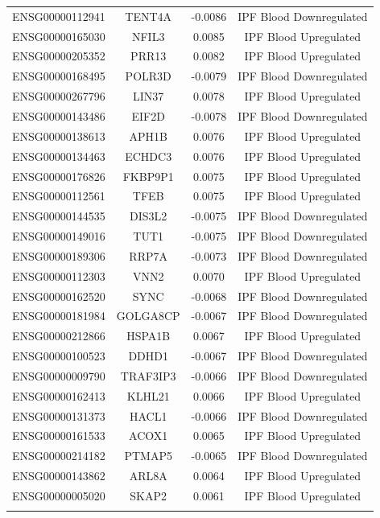 \documentclass[
]{article}
\begin{document}
\begin{singlespace}
\begin{longtable}[t]{lccc}
\addlinespace
ENSG00000112941 & TENT4A & -0.0086 & IPF Blood Downregulated\\
ENSG00000165030 & NFIL3 & 0.0085 & IPF Blood Upregulated\\
ENSG00000205352 & PRR13 & 0.0082 & IPF Blood Upregulated\\
ENSG00000168495 & POLR3D & -0.0079 & IPF Blood Downregulated\\
ENSG00000267796 & LIN37 & 0.0078 & IPF Blood Upregulated\\
\addlinespace
ENSG00000143486 & EIF2D & -0.0078 & IPF Blood Downregulated\\
ENSG00000138613 & APH1B & 0.0076 & IPF Blood Upregulated\\
ENSG00000134463 & ECHDC3 & 0.0076 & IPF Blood Upregulated\\
ENSG00000176826 & FKBP9P1 & 0.0075 & IPF Blood Upregulated\\
ENSG00000112561 & TFEB & 0.0075 & IPF Blood Upregulated\\
\addlinespace
ENSG00000144535 & DIS3L2 & -0.0075 & IPF Blood Downregulated\\
ENSG00000149016 & TUT1 & -0.0075 & IPF Blood Downregulated\\
ENSG00000189306 & RRP7A & -0.0073 & IPF Blood Downregulated\\
ENSG00000112303 & VNN2 & 0.0070 & IPF Blood Upregulated\\
ENSG00000162520 & SYNC & -0.0068 & IPF Blood Downregulated\\
\addlinespace
ENSG00000181984 & GOLGA8CP & -0.0067 & IPF Blood Downregulated\\
ENSG00000212866 & HSPA1B & 0.0067 & IPF Blood Upregulated\\
ENSG00000100523 & DDHD1 & -0.0067 & IPF Blood Downregulated\\
ENSG00000009790 & TRAF3IP3 & -0.0066 & IPF Blood Downregulated\\
ENSG00000162413 & KLHL21 & 0.0066 & IPF Blood Upregulated\\
\addlinespace
ENSG00000131373 & HACL1 & -0.0066 & IPF Blood Downregulated\\
ENSG00000161533 & ACOX1 & 0.0065 & IPF Blood Upregulated\\
ENSG00000214182 & PTMAP5 & -0.0065 & IPF Blood Downregulated\\
ENSG00000143862 & ARL8A & 0.0064 & IPF Blood Upregulated\\
ENSG00000005020 & SKAP2 & 0.0061 & IPF Blood Upregulated\\
\addlinespace

\end{longtable}
\end{singlespace}
\end{document}
